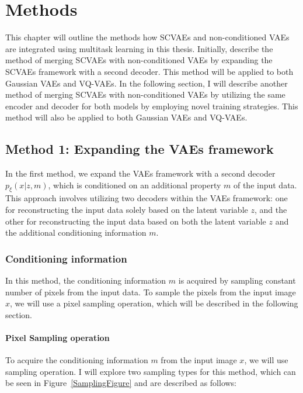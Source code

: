 \chapter{Methods}

This chapter will outline the methods how SCVAEs and non-conditioned VAEs are
integrated using multitask learning in this thesis. Initially, describe the
method of merging SCVAEs with non-conditioned VAEs by expanding the SCVAEs
framework with a second decoder. This method will be applied to both Gaussian
VAEs and VQ-VAEs. In the following section, I will describe another method of
merging SCVAEs with non-conditioned VAEs by utilizing the same encoder and
decoder for both models by employing novel training strategies. This method
will also be applied to both Gaussian VAEs and VQ-VAEs.

\section{Method 1: Expanding the VAEs framework}

In the first method, we expand the VAEs framework with a second decoder
$p_\xi(x|z,m)$, which is conditioned on an additional property $m$ of the input
data. This approach involves utilizing two decoders within the VAEs framework:
one for reconstructing the input data solely based on the latent variable $z$,
and the other for reconstructing the input data based on both the latent
variable $z$ and the additional conditioning information $m$.

\subsection{Conditioning information}

In this method, the conditioning information $m$ is acquired by sampling
constant number of pixels from the input data. To sample the pixels from the
input image $x$, we will use a pixel sampling operation, which will be
described in the following section.

\subsubsection{Pixel Sampling operation}

To acquire the conditioning information $m$ from the input image $x$, we will
use sampling operation. I will explore two sampling types for this method,
which can be seen in Figure~\ref{SamplingFigure} and are described as follows:


